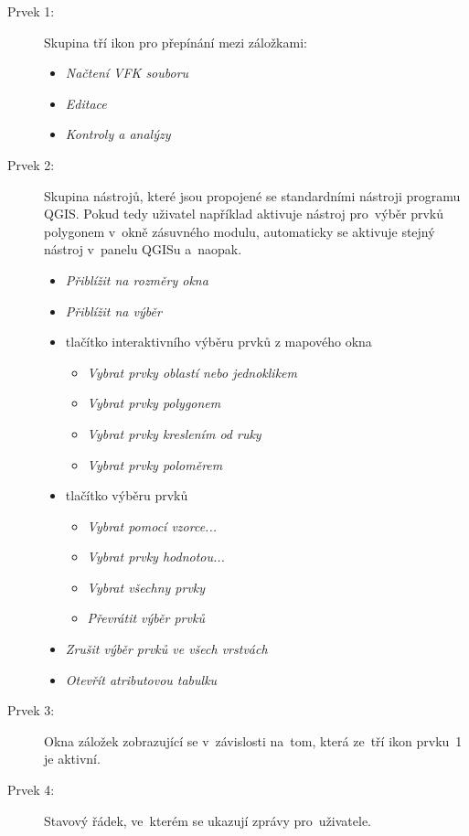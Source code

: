 \begin{description}
	\item[Prvek 1:] Skupina tří ikon pro přepínání mezi záložkami:
	\begin{itemize}[leftmargin=1.5cm, noitemsep]
		\item {} \textit{Načtení VFK souboru}
		\item {} \textit{Editace}
		\item {} \textit{Kontroly a analýzy}
 	\end{itemize}
 	
	\item[Prvek 2:] Skupina nástrojů, které jsou propojené se standardními nástroji programu QGIS. Pokud tedy uživatel například aktivuje nástroj pro~výběr prvků polygonem v~okně zásuvného modulu, automaticky se aktivuje stejný nástroj v~panelu QGISu a~naopak.
	\begin{itemize}[leftmargin=1.5cm, noitemsep]
		\item {} \textit{Přiblížit na rozměry okna}
		\item {} \textit{Přiblížit na výběr}
		\item tlačítko interaktivního výběru prvků z mapového okna
		\begin{itemize}[leftmargin=1.5cm, noitemsep]
			\item {} \textit{Vybrat prvky oblastí nebo jednoklikem}
			\item {} \textit{Vybrat prvky polygonem}
			\item {} \textit{Vybrat prvky kreslením od ruky}
			\item {} \textit{Vybrat prvky poloměrem}
 		\end{itemize}
		\item tlačítko výběru prvků
		\begin{itemize}[leftmargin=1.5cm, noitemsep]
			\item {} \textit{Vybrat pomocí vzorce...}
			\item {} \textit{Vybrat prvky hodnotou...}
			\item {} \textit{Vybrat všechny prvky}
			\item {} \textit{Převrátit výběr prvků}
 		\end{itemize}
		\item {} \textit{Zrušit výběr prvků ve všech vrstvách}
		\item {} \textit{Otevřít atributovou tabulku}
 	\end{itemize}
	\item[Prvek 3:] Okna záložek zobrazující se v~závislosti na~tom, která ze~tří ikon prvku~1 je aktivní.
	\item[Prvek 4:] Stavový řádek, ve~kterém se ukazují zprávy pro~uživatele.
\end{description}

